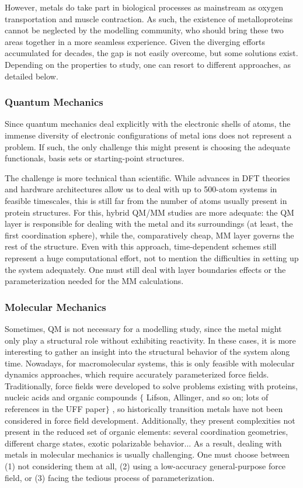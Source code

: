 However, metals do take part in biological processes as mainstream as oxygen transportation and muscle contraction. As such, the existence of metalloproteins cannot be neglected by the modelling community, who should bring these two areas together in a more seamless experience. Given the diverging efforts accumulated for decades, the gap is not easily overcome, but some solutions exist. Depending on the properties to study, one can resort to different approaches, as detailed below.

\subsubsection{Quantum Mechanics}
Since quantum mechanics deal explicitly with the electronic shells of atoms, the immense diversity of electronic configurations of metal ions does not represent a problem. If such, the only challenge this might present is choosing the adequate functionals, basis sets or starting-point structures.

The challenge is more technical than scientific. While advances in DFT theories and hardware architectures allow us to deal with up to 500-atom systems in feasible timescales, this is still far from the number of atoms usually present in protein structures. For this, hybrid QM/MM studies are more adequate: the QM layer is responsible for dealing with the metal and its surroundings (at least, the first coordination sphere), while the, comparatively cheap, MM layer governs the rest of the structure. Even with this approach, time-dependent schemes still represent a huge computational effort, not to mention the difficulties in setting up the system adequately. One must still deal with layer boundaries effects or the parameterization needed for the MM calculations.

\subsubsection{Molecular Mechanics}
Sometimes, QM is not necessary for a modelling study, since the metal might only play a structural role without exhibiting reactivity. In these cases, it is more interesting to gather an insight into the structural behavior of the system along time. Nowadays, for macromolecular systems, this is only feasible with molecular dynamics approaches, which require accurately parameterized force fields. Traditionally, force fields were developed to solve problems existing with proteins, nucleic acids and organic compounds $ \{ $ Lifson, Allinger, and so on; lots of references in the UFF paper$ \} $ , so historically transition metals have not been considered in force field development. Additionally, they present complexities not present in the reduced set of organic elements: several coordination geometries, different charge states, exotic polarizable behavior... As a result, dealing with metals in molecular mechanics is usually challenging. One must choose between (1) not considering them at all, (2) using a low-accuracy general-purpose force field, or (3) facing the tedious process of parameterization.

